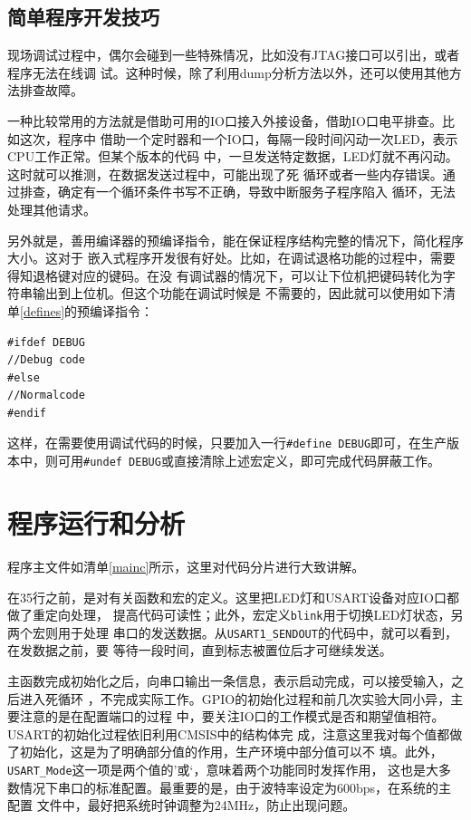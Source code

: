 \documentclass[a4paper]{ctexart}
\begin{document}
\subsection{简单程序开发技巧}

现场调试过程中，偶尔会碰到一些特殊情况，比如没有JTAG接口可以引出，或者程序无法在线调
试。这种时候，除了利用dump分析方法以外，还可以使用其他方法排查故障。

一种比较常用的方法就是借助可用的IO口接入外接设备，借助IO口电平排查。比如这次，程序中
借助一个定时器和一个IO口，每隔一段时间闪动一次LED，表示CPU工作正常。但某个版本的代码
中，一旦发送特定数据，LED灯就不再闪动。这时就可以推测，在数据发送过程中，可能出现了死
循环或者一些内存错误。通过排查，确定有一个循环条件书写不正确，导致中断服务子程序陷入
循环，无法处理其他请求。

另外就是，善用编译器的预编译指令，能在保证程序结构完整的情况下，简化程序大小。这对于
嵌入式程序开发很有好处。比如，在调试退格功能的过程中，需要得知退格键对应的键码。在没
有调试器的情况下，可以让下位机把键码转化为字符串输出到上位机。但这个功能在调试时候是
不需要的，因此就可以使用如下清单\ref{defines}的预编译指令：
\begin{lstlisting}[caption={Usage of pre-defined commands},label={defines}]
#ifdef DEBUG
//Debug code
#else
//Normalcode
#endif
\end{lstlisting}
这样，在需要使用调试代码的时候，只要加入一行\lstinline{#define DEBUG}即可，在生产版
本中，则可用\lstinline{#undef DEBUG}或直接清除上述宏定义，即可完成代码屏蔽工作。

\section{程序运行和分析}

程序主文件如清单\ref{mainc}所示，这里对代码分片进行大致讲解。

在35行之前，是对有关函数和宏的定义。这里把LED灯和USART设备对应IO口都做了重定向处理，
提高代码可读性；此外，宏定义\lstinline{blink}用于切换LED灯状态，另两个宏则用于处理
串口的发送数据。从\lstinline{USART1_SENDOUT}的代码中，就可以看到，在发数据之前，要
等待一段时间，直到标志被置位后才可继续发送。

主函数完成初始化之后，向串口输出一条信息，表示启动完成，可以接受输入，之后进入死循环
，不完成实际工作。GPIO的初始化过程和前几次实验大同小异，主要注意的是在配置端口的过程
中，要关注IO口的工作模式是否和期望值相符。USART的初始化过程依旧利用CMSIS中的结构体完
成，注意这里我对每个值都做了初始化，这是为了明确部分值的作用，生产环境中部分值可以不
填。此外，\lstinline{USART_Mode}这一项是两个值的’或‘，意味着两个功能同时发挥作用，
这也是大多数情况下串口的标准配置。最重要的是，由于波特率设定为600bps，在系统的主配置
文件中，最好把系统时钟调整为24MHz，防止出现问题。
\end{document}
